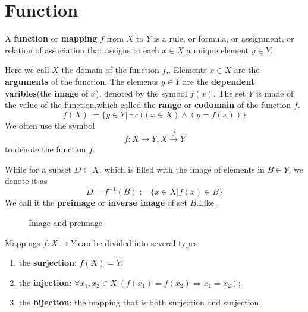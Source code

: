 \section{Function}

A \textbf{function} or \textbf{mapping} $f$ from $X$ to $Y$ is a rule, or formula, or assignment, or relation of association that assigns to each $x\in X$ a unique element $y\in Y$.

Here we call $X$ the domain of the function $f$,. Elements $x\in X$ are the \textbf{arguments}  of the function. The elements $y\in Y$ are the \textbf{dependent varibles}(the \textbf{image} of $x$), denoted by the symbol $f(x)$.
The set $Y$ is made of the value of the function,which called the \textbf{range} or \textbf{codomain} of the function $f$.
\[f(X):=\{y\in Y|\, \exists x\ ((x\in X)\wedge(y=f(x))\}\]
We often use the symbol \[f:X\longrightarrow Y,X\stackrel{f}{\longrightarrow}Y\]to denote the function $f$.


While for a subset $D\subset X$, which is filled with the image of elements in $B\in Y$, we denote it as
\[D=f^{-1}(B):=\{x\in X|f(x)\in B\}\]
We call it the \textbf{preimage} or \textbf{inverse image} of set $B$.Like .

\begin{figure}[ht]
    \centering
    \caption{Image and preimage}
    \label{Image and preimage}
    
\end{figure}
Mappings $f:X\rightarrow Y$ can be divided into several types:
\begin{enumerate}
    \item the \textbf{surjection}: $f(X)=Y$;
    \item the \textbf{injection}: $\forall x_{1},x_{2}\in X\ (f(x_{1})=f(x_{2})\Rightarrow x_{1}=x_{2})$;
    \item the \textbf{bijection}: the mapping that is both surjection and surjection.
\end{enumerate}